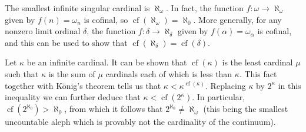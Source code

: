 \documentclass[12pt]{article}
\def\cf#1{\operatorname{cf}(#1)}
\begin{document}
The smallest infinite singular cardinal is $\aleph_{\omega}$.
In fact, the function $f\colon\omega\to\aleph_{\omega}$ given by $f(n)=\omega_n$ is cofinal, so $\cf{\aleph_\omega}=\aleph_0$.
More generally, for any nonzero limit ordinal $\delta$, the function $f\colon\delta\to\aleph_\delta$ given by $f(\alpha)=\omega_\alpha$ is cofinal, and this can be used to show that $\cf{\aleph_\delta}=\cf{\delta}$.

Let $\kappa$ be an infinite cardinal.
It can be shown that $\cf{\kappa}$ is 
the least cardinal $\mu$ such that $\kappa$ is 
the sum of $\mu$ cardinals each of which is less than $\kappa$.
This fact together with K\"onig's theorem tells us that  
$\kappa<\kappa^{\cf{\kappa}}$.
Replacing $\kappa$ by $2^\kappa$ in this inequality 
we can further deduce that $\kappa<\cf{2^\kappa}$.
In particular, $\cf{2^{\aleph_0}}>\aleph_0$, from which it follows that $2^{\aleph_0}\neq\aleph_\omega$ (this being the smallest uncountable aleph which is provably not the cardinality of the continuum).
\end{document}

